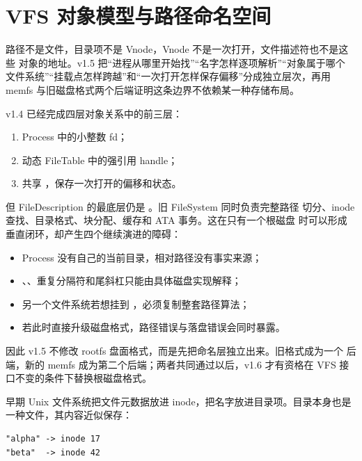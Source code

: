 \section{VFS 对象模型与路径命名空间}

\begin{keyidea}
路径不是文件，目录项不是 Vnode，Vnode 不是一次打开，文件描述符也不是这些
对象的地址。v1.5 把“进程从哪里开始找”“名字怎样逐项解析”“对象属于哪个
文件系统”“挂载点怎样跨越”和“一次打开怎样保存偏移”分成独立层次，再用
memfs 与旧磁盘格式两个后端证明这条边界不依赖某一种存储布局。
\end{keyidea}

v1.4 已经完成四层对象关系中的前三层：

\begin{enumerate}
  \item Process 中的小整数 fd；
  \item 动态 FileTable 中的强引用 handle；
  \item 共享 ，保存一次打开的偏移和状态。
\end{enumerate}

但 FileDescription 的最底层仍是
。旧 FileSystem 同时负责完整路径
切分、inode 查找、目录格式、块分配、缓存和 ATA 事务。这在只有一个根磁盘
时可以形成垂直闭环，却产生四个继续演进的障碍：

\begin{itemize}
  \item Process 没有自己的当前目录，相对路径没有事实来源；
  \item {}、、重复分隔符和尾斜杠只能由具体磁盘实现解释；
  \item 另一个文件系统若想挂到 ，必须复制整套路径算法；
  \item 若此时直接升级磁盘格式，路径错误与落盘错误会同时暴露。
\end{itemize}

因此 v1.5 不修改 rootfs 盘面格式，而是先把命名层独立出来。旧格式成为一个
后端，新的 memfs 成为第二个后端；两者共同通过以后，v1.6 才有资格在 VFS
接口不变的条件下替换根磁盘格式。

早期 Unix 文件系统把文件元数据放进 inode，把名字放进目录项。目录本身也是
一种文件，其内容近似保存：

\begin{lstlisting}[caption={目录项表达的是父目录中的名字映射}]
"alpha" -> inode 17
"beta"  -> inode 42
\end{lstlisting}

